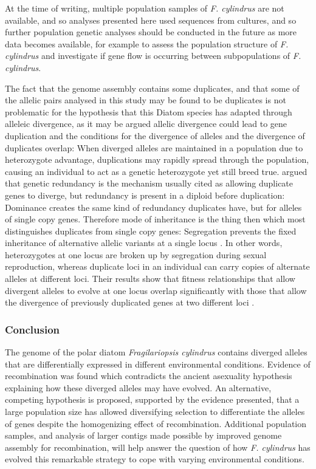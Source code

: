 At the time of writing, multiple population samples of \textit{F. cylindrus} are not available, and so analyses presented here used sequences from cultures, and so further population genetic analyses should be conducted in the future as more data becomes available, for example to assess the population structure of \textit{F. cylindrus} and investigate if gene flow is occurring between subpopulations of \textit{F. cylindrus}.

The fact that the genome assembly contains some duplicates, and that some of the allelic pairs analysed in this study may be found to be duplicates is not problematic for the hypothesis that this Diatom species has adapted through alleleic divergence, as it may be argued allelic divergence could lead to gene duplication and the conditions for the divergence of alleles and the divergence of duplicates overlap: 
When diverged alleles are maintained in a population due to heterozygote advantage, duplications may rapidly spread through the population, causing an individual to act as a genetic heterozygote yet still breed true.
\cite{Proulx2006} argued that genetic redundancy is the mechanism usually cited as allowing duplicate genes to diverge, but redundancy is present in a diploid before duplication: Dominance creates the same kind of redundancy duplicates have, but for alleles of single copy genes.
Therefore mode of inheritance is the thing then which most distinguishes duplicates from single copy genes: Segregation prevents the fixed inheritance of alternative allelic variants at a single locus \parencite{Proulx2006}.
In other words, heterozygotes at one locus are broken up by segregation during sexual reproduction, whereas duplicate loci in an individual can carry copies of alternate alleles at different loci.
Their results show that fitness relationships that allow divergent alleles to evolve at one locus overlap significantly with those that allow the divergence of previously duplicated genes at two different loci \parencite{Proulx2006}.


\subsubsection{Conclusion}

The genome of the polar diatom \textit{Fragilariopsis cylindrus} contains diverged alleles that are differentially expressed in different environmental conditions.
Evidence of recombination was found which contradicts the ancient asexuality hypothesis explaining how these diverged alleles may have evolved.
An alternative, competing hypothesis is proposed, supported by the evidence presented, that a large population size has allowed diversifying selection to differentiate the alleles of genes despite the homogenizing effect of recombination.
Additional population samples, and analysis of larger contigs made possible by improved genome assembly for recombination, will help answer the question of how \textit{F. cylindrus} has evolved this remarkable strategy to cope with varying environmental conditions.



